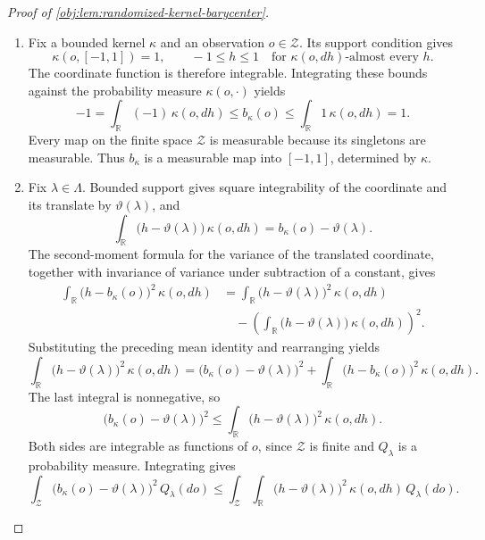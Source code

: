 \begin{proof}[Proof of \cref{obj:lem:randomized-kernel-barycenter}]
\begin{enumerate}
\item Fix a bounded kernel \(\kappa\) and an observation \(o\in\mathcal Z\). Its support condition gives
\[
\kappa(o,[-1,1])=1,
\qquad
-1\le h\le 1
\quad\text{for }\kappa(o,dh)\text{-almost every }h.
\]
The coordinate function is therefore integrable. Integrating these bounds against the probability measure \(\kappa(o,\cdot)\) yields
\[
-1=\int_{\mathbb R}(-1)\,\kappa(o,dh)
\le b_\kappa(o)
\le \int_{\mathbb R}1\,\kappa(o,dh)=1.
\]
Every map on the finite space \(\mathcal Z\) is measurable because its singletons are measurable. Thus \(b_\kappa\) is a measurable map into \([-1,1]\), determined by \(\kappa\). %

\item Fix \(\lambda\in\Lambda\). Bounded support gives square integrability of the coordinate and its translate by \(\vartheta(\lambda)\), and
\[
\int_{\mathbb R}\bigl(h-\vartheta(\lambda)\bigr)\,\kappa(o,dh)
=b_\kappa(o)-\vartheta(\lambda).
\]
The second-moment formula for the variance of the translated coordinate, together with invariance of variance under subtraction of a constant, gives
\[
\begin{aligned}
\int_{\mathbb R}\bigl(h-b_\kappa(o)\bigr)^2\,\kappa(o,dh)
&=
\int_{\mathbb R}\bigl(h-\vartheta(\lambda)\bigr)^2\,\kappa(o,dh)\\
&\quad-
\left(
\int_{\mathbb R}\bigl(h-\vartheta(\lambda)\bigr)\,\kappa(o,dh)
\right)^2.
\end{aligned}
\]
Substituting the preceding mean identity and rearranging yields
\[
\int_{\mathbb R}\bigl(h-\vartheta(\lambda)\bigr)^2\,\kappa(o,dh)
=
\bigl(b_\kappa(o)-\vartheta(\lambda)\bigr)^2
+
\int_{\mathbb R}\bigl(h-b_\kappa(o)\bigr)^2\,\kappa(o,dh).
\]
The last integral is nonnegative, so
\[
\bigl(b_\kappa(o)-\vartheta(\lambda)\bigr)^2
\le
\int_{\mathbb R}\bigl(h-\vartheta(\lambda)\bigr)^2\,\kappa(o,dh).
\]
Both sides are integrable as functions of \(o\), since \(\mathcal Z\) is finite and \(Q_\lambda\) is a probability measure. Integrating gives
\[
\int_{\mathcal Z}\bigl(b_\kappa(o)-\vartheta(\lambda)\bigr)^2\,Q_\lambda(do)
\le
\int_{\mathcal Z}\int_{\mathbb R}
\bigl(h-\vartheta(\lambda)\bigr)^2\,\kappa(o,dh)\,Q_\lambda(do).
\]


\end{enumerate}
\end{proof}
